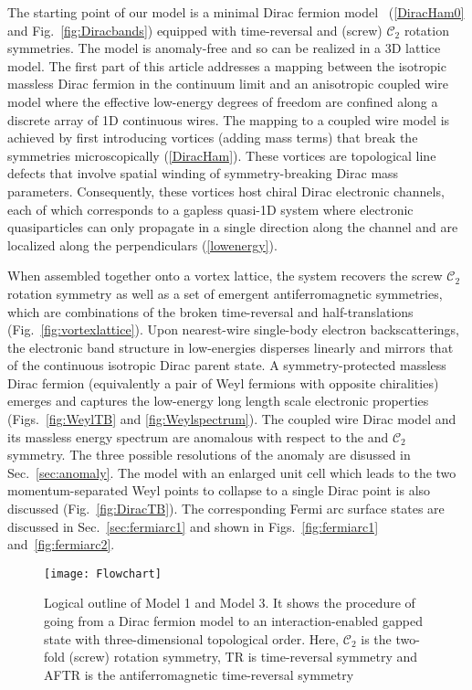 The starting point of our model is a minimal Dirac fermion model ~(\ref{DiracHam0} and Fig.~\ref{fig:Diracbands}) equipped with time-reversal and (screw) $\mathcal{C}_2$ rotation symmetries. The model is anomaly-free and so can be realized in a 3D lattice model. The first part of this article addresses a mapping between the isotropic massless Dirac fermion in the continuum limit and an anisotropic coupled wire model where the effective low-energy degrees of freedom are confined along a discrete array of 1D continuous wires. The mapping to a coupled wire model is achieved by first introducing vortices (adding mass terms) that break the symmetries microscopically (\ref{DiracHam}). These vortices are topological line defects that involve spatial winding of symmetry-breaking Dirac mass parameters. Consequently, these vortices host chiral Dirac electronic channels, each of which corresponds to a gapless quasi-1D system where electronic quasiparticles can only propagate in a single direction along the channel and are localized along the perpendiculars (\ref{lowenergy}).	

When assembled together onto a vortex lattice, the system recovers the screw $\mathcal{C}_2$ rotation symmetry as well as a set of emergent antiferromagnetic symmetries, which are combinations of the broken time-reversal and half-translations (Fig.~\ref{fig:vortexlattice}). Upon nearest-wire single-body electron backscatterings, the electronic band structure in low-energies disperses linearly and mirrors that of the continuous isotropic Dirac parent state. A symmetry-protected massless Dirac fermion (equivalently a pair of Weyl fermions with opposite chiralities) emerges and captures the low-energy long length scale electronic properties (Figs.~\ref{fig:WeylTB} and \ref{fig:Weylspectrum}). The coupled wire Dirac model and its massless energy spectrum are anomalous with respect to the \AFTR and $\mathcal{C}_2$ symmetry. The three possible resolutions of the anomaly are disussed in Sec.~\ref{sec:anomaly}. The model with an enlarged unit cell which leads to the two momentum-separated Weyl points to collapse to a single Dirac point is also discussed (Fig.~\ref{fig:DiracTB}). The corresponding Fermi arc surface states are discussed in Sec.~\ref{sec:fermiarc1} and shown in Figs.~\ref{fig:fermiarc1} and~\ref{fig:fermiarc2}.

\begin{figure}[htbp]
	\centering\texttt{[image: Flowchart]}
	\caption[Logical outline of Model 1 and Model 3.]{Logical outline of Model 1 and Model 3.  It shows the procedure of going from a Dirac fermion model to an interaction-enabled gapped state with three-dimensional topological order. Here, $\mathcal{C}_2$ is the two-fold (screw) rotation symmetry, TR is time-reversal symmetry and AFTR is the antiferromagnetic time-reversal symmetry}\label{fig:Flowchart}
\end{figure}

